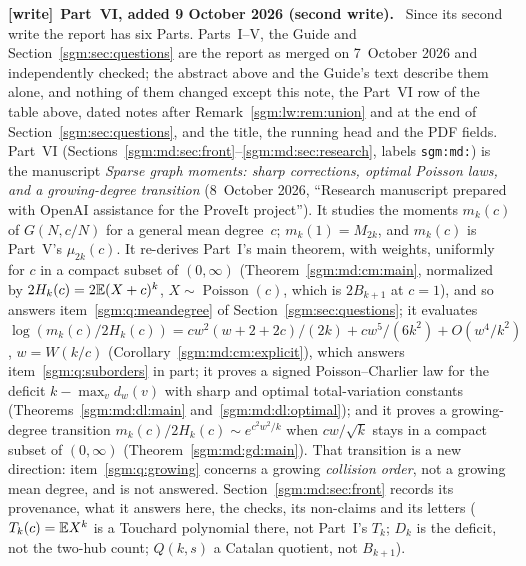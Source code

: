 \documentclass[11pt,letterpaper]{article}
\theoremstyle{remark}\newtheorem{remark}[theorem]{Remark}
\newcommand{\Poi}{\operatorname{Poisson}}\newcommand{\Bin}{\operatorname{Bin}}
\newcommand{\file}[1]{\nolinkurl{#1}}
\newenvironment{writenote}[1][]{\par\smallskip\begingroup\small
 \noindent\textbf{[write]}\if\relax\detokenize{#1}\relax\else~\textbf{#1.}\fi\ }%
 {\par\endgroup\smallskip}
\theoremstyle{definition}\newtheorem{definition}[theorem]{Definition}
\begin{document}
\begin{writenote}[Part~VI, added 9 October 2026 (second write)]
Since its second write the report has six Parts. Parts~I--V, the Guide and
Section~\ref{sgm:sec:questions} are the report as merged on 7~October 2026
and independently checked; the abstract above and the Guide's text describe
them alone, and nothing of them changed except this note, the Part~VI row of
the table above, dated notes after Remark~\ref{sgm:lw:rem:union} and at the
end of Section~\ref{sgm:sec:questions}, and the title, the running head and
the PDF fields. Part~VI
(Sections~\ref{sgm:md:sec:front}--\ref{sgm:md:sec:research}, labels
\file{sgm:md:}) is the manuscript \emph{Sparse graph moments: sharp
corrections, optimal Poisson laws, and a growing-degree transition}
(8~October 2026, ``Research manuscript prepared with OpenAI assistance for
the ProveIt project''). It studies the moments $m_k(c)$ of $G(N,c/N)$ for a
general mean degree~$c$; $m_k(1)=M_{2k}$, and $m_k(c)$ is Part~V's
$\mu_{2k}(c)$. It re-derives Part~I's main theorem, with weights, uniformly
for $c$ in a compact subset of $(0,\infty)$
(Theorem~\ref{sgm:md:cm:main}, normalized by $2H_k(c)=2\mathbb E(X+c)^k$,
$X\sim\Poi(c)$, which is $2B_{k+1}$ at $c=1$), and so answers
item~\ref{sgm:q:meandegree} of Section~\ref{sgm:sec:questions}; it evaluates
$\log(m_k(c)/2H_k(c))=cw^2(w+2+2c)/(2k)+cw^5/(6k^2)+O(w^4/k^2)$,
$w=W(k/c)$ (Corollary~\ref{sgm:md:cm:explicit}), which answers
item~\ref{sgm:q:suborders} in part; it proves a signed Poisson--Charlier law
for the deficit $k-\max_vd_w(v)$ with sharp and optimal total-variation
constants (Theorems~\ref{sgm:md:dl:main} and~\ref{sgm:md:dl:optimal}); and
it proves a growing-degree transition
$m_k(c)/2H_k(c)\sim e^{c^2w^2/k}$ when $cw/\sqrt k$ stays in a compact
subset of $(0,\infty)$ (Theorem~\ref{sgm:md:gd:main}). That transition is a
new direction: item~\ref{sgm:q:growing} concerns a growing \emph{collision
order}, not a growing mean degree, and is not answered.
Section~\ref{sgm:md:sec:front} records its provenance, what it answers here,
the checks, its non-claims and its letters ($T_k(c)=\mathbb E X^k$ is a Touchard
polynomial there, not Part~I's $T_k$; $D_k$ is the deficit, not the two-hub
count; $Q(k,s)$ a Catalan quotient, not $B_{k+1}$).
\end{writenote}
\end{document}
